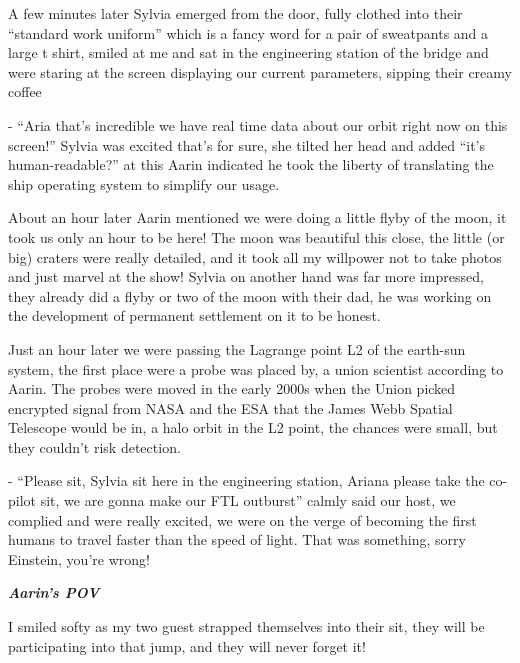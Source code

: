 \documentclass[hidelinks,12pt,a4paper]{book}
\begin{document}
A few minutes later Sylvia emerged from the door, fully clothed into their “standard work uniform” which is a fancy 
word for a pair of sweatpants and a large t shirt, smiled at me and sat in the engineering station of 
the bridge and were staring at the screen displaying our current parameters, sipping their creamy coffee\par
\bigskip

- “Aria that's incredible we have real time data about our orbit right now on this screen!” Sylvia was excited 
that's for sure, she tilted her head and added “it's human-readable?” at this Aarin indicated he took the liberty 
of translating the ship operating system to simplify our usage.\par
\bigskip

About an hour later Aarin mentioned we were doing a little flyby of the moon, it took us only an hour to be here! 
The moon was beautiful this close, the little (or big) craters were really detailed, and it took all my willpower 
not to take photos and just marvel at the show! Sylvia on another hand was far more impressed, they already did a 
flyby or two of the moon with their dad, he was working on the development of permanent settlement on it to be honest.\par
\bigskip

Just an hour later we were passing the Lagrange point L2 of the earth-sun system, the first place were a probe was 
placed by, a union scientist according to Aarin. The probes were moved in the early 2000s when the Union 
picked encrypted signal from NASA and the ESA that the James Webb Spatial Telescope would be in, a halo orbit in the 
L2 point, the chances were small, but they couldn't risk detection.\par
\bigskip

- “Please sit, Sylvia sit here in the engineering station, Ariana please take the co-pilot sit, we are gonna make 
our FTL outburst” calmly said our host, we complied and were really excited, we were on the verge of becoming 
the first humans to travel faster than the speed of light. That was something, sorry Einstein, you're wrong!\par
\bigskip


\textit{\textbf{Aarin's POV}}\par
\bigskip

I smiled softy as my two guest strapped themselves into their sit, they will be participating into 
that jump, and they will never forget it!\par
\bigskip
\end{document}
